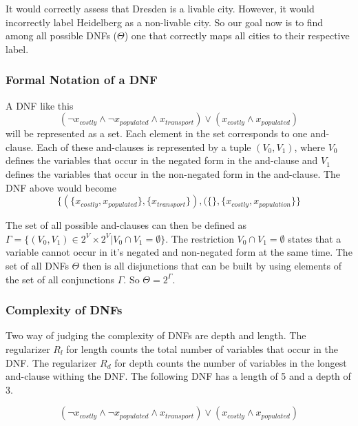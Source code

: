 \documentclass{article}
\begin{document}
It would correctly assess that Dresden is a livable city. However, it would incorrectly label Heidelberg as a non-livable city. So our goal now is to find among all possible DNFs ($\Theta$) one that correctly maps all cities to their respective label.

\subsubsection{Formal Notation of a DNF}

A DNF like this
\begin{equation*}
    (\lnot x_{costly} \land \lnot x_{populated} \land x_{transport}) \lor (x_{costly} \land x_{populated})
\end{equation*}
will be represented as a set. Each element in the set corresponds to one and-clause. Each of these and-clauses is represented by a tuple $(V_0, V_1)$, where $V_0$ defines the variables that occur in the negated form in the and-clause and $V_1$ defines the variables that occur in the non-negated form in the and-clause. The DNF above would become
\begin{equation*}
    \{(\{x_{costly}, x_{populated}\}, \{x_{transport}\}), (\{\}, \{x_{costly}, x_{population}\}\}
\end{equation*}

The set of all possible and-clauses can then be defined as $\Gamma = \{(V_0, V_1) \in 2^V \times 2^V | V_0 \cap V_1 = \emptyset \}$. The restriction $V_0 \cap V_1 = \emptyset$ states that a variable cannot occur in it's negated and non-negated form at the same time. The set of all DNFs $\Theta$ then is all disjunctions that can be built by using elements of the set of all conjunctions $\Gamma$. So $\Theta = 2^\Gamma$.

\subsubsection{Complexity of DNFs}
Two way of judging the complexity of DNFs are depth and length. The regularizer $R_l$ for length counts the total number of variables that occur in the DNF. The regularizer $R_d$ for depth counts the number of variables in the longest and-clause withing the DNF. The following DNF has a length of 5 and a depth of 3.

\begin{equation*}
    (\lnot x_{costly} \land \lnot x_{populated} \land x_{transport}) \lor (x_{costly} \land x_{populated})
\end{equation*}
\end{document}
